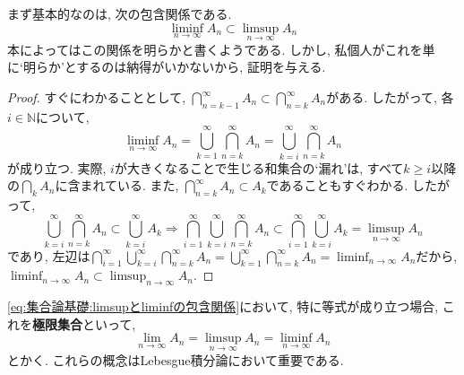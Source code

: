 \documentclass[a4j,dvipdfmx]{jsarticle}
\numberwithin{equation}{section}
\begin{document}
            まず基本的なのは, 次の包含関係である.
            \begin{equation}
                \liminf_{n\to\infty}A_n\subset\limsup_{n\to\infty}A_n \label{eq:集合論基礎:limsupとliminfの包含関係}
            \end{equation}
            本によってはこの関係を明らかと書くようである. しかし, 私個人がこれを単に`明らか'とするのは納得がいかないから, 証明を与える.
            \begin{proof}
                すぐにわかることとして, $\displaystyle \bigcap_{n=k-1}^\infty A_n\subset\bigcap_{n=k}^\infty A_n$がある. したがって, 各$i\in\mathbb{N}$について, 
                \begin{equation*}
                    \liminf_{n\to\infty} A_n=\bigcup_{k=1}^{\infty}\bigcap_{n=k}^\infty A_n=\bigcup_{k=i}^{\infty}\bigcap_{n=k}^\infty A_n
                \end{equation*}
                が成り立つ. 実際, $i$が大きくなることで生じる和集合の`漏れ'は, すべて$k\geq i$以降の$\bigcap_{k} A_n$に含まれている.
                また, $\displaystyle \bigcap_{n=k}^\infty A_n\subset A_k$であることもすぐわかる. したがって, 
                \begin{equation*}
                    \bigcup_{k=i}^{\infty}\bigcap_{n=k}^\infty A_n\subset \bigcup_{k=i}^{\infty}A_k\Rightarrow \bigcap_{i=1}^\infty\bigcup_{k=i}^{\infty}\bigcap_{n=k}^\infty A_n\subset \bigcap_{i=1}^\infty\bigcup_{k=i}^{\infty}A_k=\limsup_{n\to\infty}A_n
                \end{equation*}
                であり, 左辺は$\displaystyle \bigcap_{i=1}^\infty\bigcup_{k=i}^{\infty}\bigcap_{n=k}^\infty A_n=\bigcup_{k=1}^{\infty}\bigcap_{n=k}^\infty A_n=\liminf_{n\to\infty}A_n$だから, $\displaystyle\liminf_{n\to\infty}A_n\subset\limsup_{n\to\infty}A_n$.
            \end{proof}
            \eqref{eq:集合論基礎:limsupとliminfの包含関係}において, 特に等式が成り立つ場合, これを\textbf{極限集合}といって, 
            \begin{equation}
                \lim_{n\to\infty}A_n=\limsup_{n\to\infty}A_n=\liminf_{n\to\infty}A_n \label{eq:集合論基礎:極限集合の定義}
            \end{equation}
            とかく. これらの概念はLebesgue積分論において重要である.
            \clearpage


        \clearpage
\end{document}
